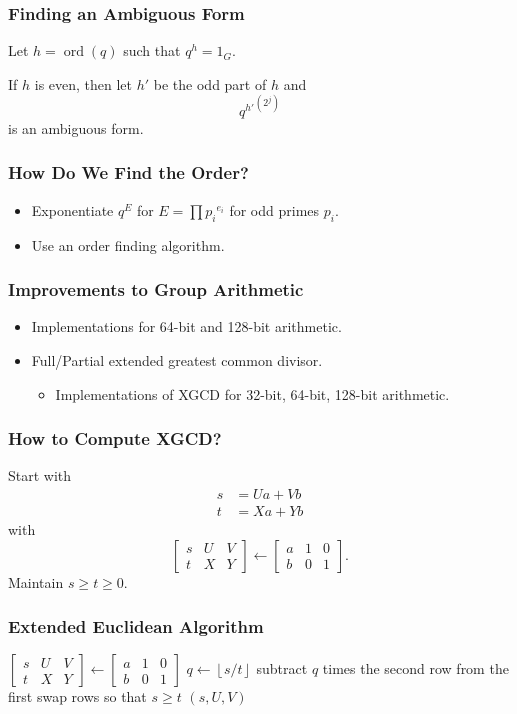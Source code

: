 \documentclass{beamer}
\DeclareMathOperator{\ord}{ord}
\newcommand{\ZZgez}{\mathbb{Z}_{\ge 0}}
\newcommand{\matrixThreeTwo}[6]{\left[ \begin{array}{rrr} #1 & #2 & #3 \\ #4 & #5 & #6 \end{array} \right]}
\newcommand{\floor}[1]{\left\lfloor #1 \right\rfloor}
\begin{document}
\begin{frame}
\frametitle{Finding an Ambiguous Form}
Let $h = \ord(q)$ such that $q^h = 1_G$.

\bigbreak
If $h$ is even, then let $h'$ be the odd part of $h$ and
\[
	{q^{h'}}^{\left(2^j\right)}
\]
is an ambiguous form.
\end{frame}

\begin{frame}
\frametitle{How Do We Find the Order?}
\begin{itemize}
\item Exponentiate $q^E$ for $E = \prod {p_i}^{e_i}$ for odd primes $p_i$.
\item Use an order finding algorithm. 
\end{itemize}
\end{frame}



  
\begin{frame}
\frametitle{Improvements to Group Arithmetic}
\begin{itemize}
\item Implementations for 64-bit and 128-bit arithmetic.
\item Full/Partial extended greatest common divisor.
	\begin{itemize}
	\item Implementations of XGCD for 32-bit, 64-bit, 128-bit arithmetic.
	\end{itemize}
\end{itemize}
\end{frame}

\begin{frame}
\frametitle{How to Compute XGCD?}
Start with
\begin{align*}
s &= Ua + Vb \\
t &= Xa + Yb
\end{align*}
with
\[
\matrixThreeTwo{s}{U}{V}{t}{X}{Y} \gets \matrixThreeTwo{a}{1}{0}{b}{0}{1}.
\]
Maintain $s \ge t \ge 0$.
\end{frame}

\begin{frame}
\frametitle{Extended Euclidean Algorithm}
\begin{algorithmic}[1]
 \Comment{$a, b \in \ZZgez$}
\State $\matrixThreeTwo{s}{U}{V}{t}{X}{Y} \gets \matrixThreeTwo{a}{1}{0}{b}{0}{1}$
	\State $q \gets \floor{s/t}$
	\State subtract $q$ times the second row from the first
	\State swap rows so that $s \ge t$
\EndWhile
\State \Return $(s, U, V)$
\EndProcedure
\end{algorithmic}
\end{frame}
\end{document}
